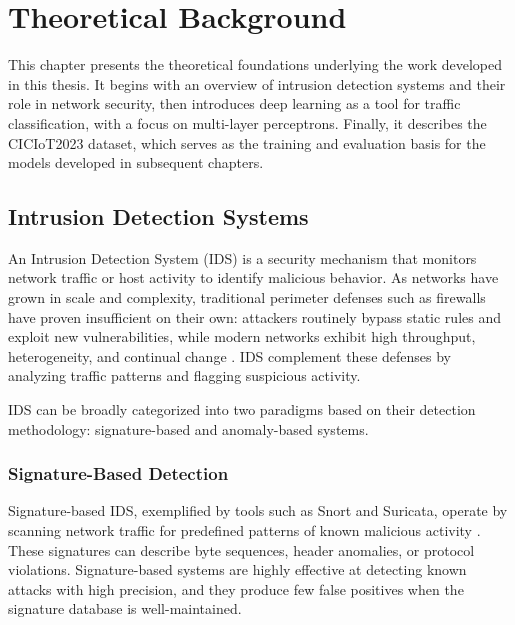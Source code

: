 \chapter{Theoretical Background}
\label{chap:theoretical_background}

\par This chapter presents the theoretical foundations underlying the work developed in this thesis. It begins with an overview of intrusion detection systems and their role in network security, then introduces deep learning as a tool for traffic classification, with a focus on multi-layer perceptrons. Finally, it describes the CICIoT2023 dataset, which serves as the training and evaluation basis for the models developed in subsequent chapters.

\section{Intrusion Detection Systems}
\label{sec:ids}

\par An Intrusion Detection System (IDS) is a security mechanism that monitors network traffic or host activity to identify malicious behavior. As networks have grown in scale and complexity, traditional perimeter defenses such as firewalls have proven insufficient on their own: attackers routinely bypass static rules and exploit new vulnerabilities, while modern networks exhibit high throughput, heterogeneity, and continual change \cite{Lansky2021}. IDS complement these defenses by analyzing traffic patterns and flagging suspicious activity.

\par IDS can be broadly categorized into two paradigms based on their detection methodology: signature-based and anomaly-based systems.

\subsection{Signature-Based Detection}
\label{subsec:signature_ids}

\par Signature-based IDS, exemplified by tools such as Snort and Suricata, operate by scanning network traffic for predefined patterns of known malicious activity \cite{Roesch1999}. These signatures can describe byte sequences, header anomalies, or protocol violations. Signature-based systems are highly effective at detecting known attacks with high precision, and they produce few false positives when the signature database is well-maintained.

